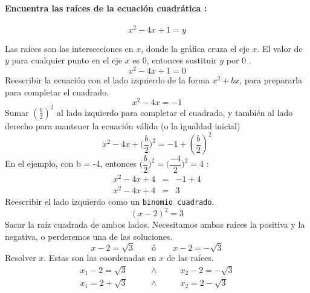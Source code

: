 \documentclass[12pt, a5paper]{article}
\begin{document}
\paragraph*{Encuentra las raíces de la ecuación cuadrática :} $$x^2 - 4x + 1 = y$$

Las raíces son las intersecciones en $x$, donde la gráfica cruza el eje $x$. El valor de $y$ para cualquier punto en el eje $x$ es $0$, entonces sustituir $y$ por $0$ .
$$
x^2 - 4x + 1 = 0
$$
Reescribir la ecuación con el lado izquierdo de la forma $x^2 + bx$, para prepararla para completar el cuadrado.
$$
x^2 - 4x = -1
$$
Sumar $(\frac{b}{2})^2$ al lado izquierdo para completar el cuadrado, y también al lado derecho para mantener la ecuación válida (o la igualdad inicial)
$$
x^2 - 4x + \Big(\dfrac{b}{2}\Big)^2 = -1 + (\frac{b}{2})^2
$$
En el ejemplo, con b = -4, entonces $\Big(\dfrac{b}{2}\Big)^2 = \Big(\dfrac{-4}{2}\Big)^2 = 4$ :
\begin{eqnarray*}
x^2 - 4x + 4 &=& -1 + 4  \\
x^2 - 4x + 4 &=& 3
\end{eqnarray*}
Reescribir el lado izquierdo como un \texttt{binomio cuadrado}.
$$
(x - 2)^2 = 3
$$
Sacar la raíz cuadrada de ambos lados. Necesitamos ambas raíces la positiva y la negativa, o perderemos una de las soluciones.
$$
x - 2 = \sqrt{3}\qquad\text{ó}\qquad x - 2 = - \sqrt{3}
$$
Resolver $x$. Estas son las coordenadas en $x$ de las raíces.
\begin{eqnarray*}
x_1 - 2 = \sqrt{3}\qquad&\wedge&\qquad x_2 - 2 = - \sqrt{3} \\
x_1 = 2 + \sqrt{3}\qquad&\wedge&\qquad x_2 = 2 - \sqrt{3} \\
\end{eqnarray*}
\end{document}

